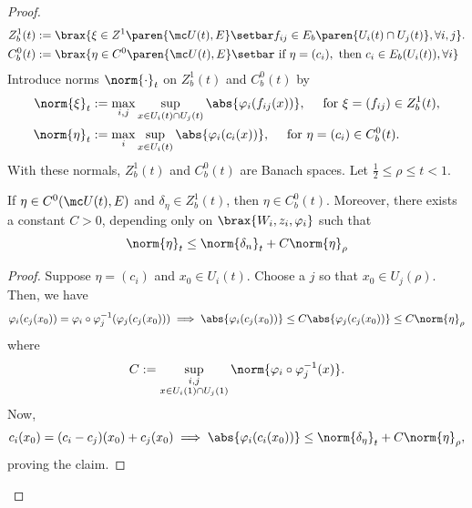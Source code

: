 \documentclass[11pt]{report}
\begin{document}
\begin{proof}
\begin{align*}
            Z_b^1(t) &:=\brax{ \xi \in Z^1\paren{ \mc U(t), E } \setbar f_{ij}\in E_b \paren{ U_i(t) \cap U_j(t) }, \forall i,j}.
            \\ C_b^0(t) &:= \brax{ \eta \in C^0\paren{\mc U(t),E} \setbar \text{ if } \eta = (c_i), \text{ then } c_i \in E_b(U_i(t)), \forall i }
    \end{align*}
    Introduce norms $\norm{\cdot}_t$ on $Z_b^1(t)$ and $C_b^0(t)$ by 
    \begin{align*}
        \norm{\xi}_t &:= \max_{i,j}\sup_{x \in U_i(t)\cap U_j(t)}\abs{ \varphi_i(f_{ij}(x)) }, \quad \text{ for } \xi=(f_{ij})\in Z_b^1(t),
        \\ \norm{\eta}_t &:= \max_{i} \sup_{x \in U_i(t)}\abs{\varphi_i(c_i(x))}, \quad \text{ for } \eta=(c_i)\in C_b^0(t).
    \end{align*}
    With these normals, $Z_b^1(t)$ and $C_b^0(t)$ are Banach spaces. Let $\frac{1}{2} \leq \rho \leq t < 1$.
    \begin{claim}[][label=claim:2nd-finite-claim-2]
        If $\eta \in C^0(\mc U(t),E)$ and $\delta_\eta \in Z^1_b(t)$, then $\eta \in C_b^0(t)$. Moreover, there exists a constant $C>0$, depending only on $\brax{W_i,z_i,\varphi_i}$ such that
        \[
        \norm{\eta}_t \leq \norm{\delta_n}_t + C\norm{\eta}_\rho
        \]
    \end{claim}
    \begin{proof}
    Suppose $\eta = (c_i)$ and $x_0 \in U_i(t)$. Choose a $j$ so that $x_0 \in U_j(\rho)$. Then, we have
    \[
    \varphi_i(c_j(x_0))=\varphi_i\circ \varphi_j^{-1}(\varphi_j(c_j(x_0))) \implies \abs{\varphi_i(c_j(x_0))} \leq C\abs{ \varphi_j(c_j(x_0))} \leq C \norm{\eta}_\rho
    \]
    where
    \[
    C:= \sup_{ \substack{i,j \\ x \in U_i(1) \cap U_j(1)} }\norm{ \varphi_i \circ \varphi_j^{-1}(x) }.
    \]
    Now, 
    \[
    c_i(x_0) = (c_i-c_j)(x_0)+ c_j(x_0) \implies \abs{\varphi_i(c_i(x_0))} \leq \norm{\delta_\eta}_t + C\norm{\eta}_\rho,
    \]
    proving the claim.
    \end{proof}


\end{proof}
\end{document}
